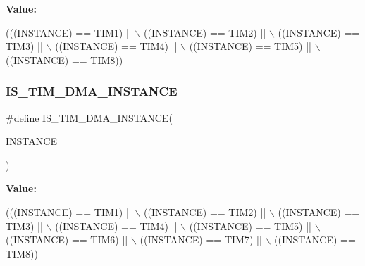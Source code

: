 {\bfseries Value\+:}
\begin{DoxyCode}
(((INSTANCE) == TIM1) || \(\backslash\)
                                          ((INSTANCE) == TIM2) || \(\backslash\)
                                          ((INSTANCE) == TIM3) || \(\backslash\)
                                          ((INSTANCE) == TIM4) || \(\backslash\)
                                          ((INSTANCE) == TIM5) || \(\backslash\)
                                          ((INSTANCE) == TIM8))
\end{DoxyCode}
\mbox{\label{group___exported__macros_gad51d77b3bcc12a3a5c308d727b561371}} 
\subsubsection{\texorpdfstring{I\+S\+\_\+\+T\+I\+M\+\_\+\+D\+M\+A\+\_\+\+I\+N\+S\+T\+A\+N\+CE}{IS\_TIM\_DMA\_INSTANCE}}
{\footnotesize\ttfamily \#define I\+S\+\_\+\+T\+I\+M\+\_\+\+D\+M\+A\+\_\+\+I\+N\+S\+T\+A\+N\+CE(\begin{DoxyParamCaption}\item[{}]{I\+N\+S\+T\+A\+N\+CE }\end{DoxyParamCaption})}

{\bfseries Value\+:}
\begin{DoxyCode}
(((INSTANCE) == TIM1) || \(\backslash\)
                                       ((INSTANCE) == TIM2) || \(\backslash\)
                                       ((INSTANCE) == TIM3) || \(\backslash\)
                                       ((INSTANCE) == TIM4) || \(\backslash\)
                                       ((INSTANCE) == TIM5) || \(\backslash\)
                                       ((INSTANCE) == TIM6) || \(\backslash\)
                                       ((INSTANCE) == TIM7) || \(\backslash\)
                                       ((INSTANCE) == TIM8))
\end{DoxyCode}
\mbox{\label{group___exported__macros_ga1ed43d4e9823446a1b9d43afc452f42e}} 
